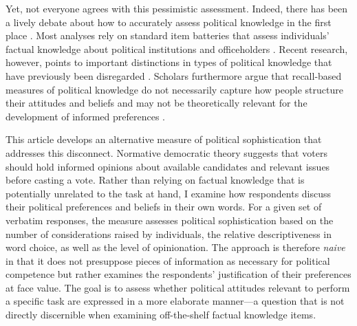 \documentclass[12pt]{article}
\begin{document}
Yet, not everyone agrees with this pessimistic assessment. Indeed, there has been a lively debate about how to accurately assess political knowledge in the first place \citep[e.g.][]{mondak2000reconsidering,mondak2001asked,sturgis2008experiment,debell2013harder,pietryka2013analysis}. Most analyses rely on standard item batteries that assess individuals' factual knowledge about political institutions and officeholders \citep[e.g.,][]{carpini1996americans}. Recent research, however, points to important distinctions in types of political knowledge that have previously been disregarded \citep{barabas2014question}. Scholars furthermore argue that recall-based measures of political knowledge do not necessarily capture how people structure their attitudes and beliefs \citep[e.g.,][]{luskin1987measuring} and may not be theoretically relevant for the development of informed preferences \citep[e.g.,][]{lupia2006elitism,gilens2001political}.


This article develops an alternative measure of political sophistication that addresses this disconnect. Normative democratic theory suggests that voters should hold informed opinions about available candidates and relevant issues before casting a vote. Rather than relying on factual knowledge that is potentially unrelated to the task at hand, I examine how respondents discuss their political preferences and beliefs in their own words. For a given set of verbatim responses, the measure assesses political sophistication based on the number of considerations raised by individuals, the relative descriptiveness in word choice, as well as the level of opinionation. The approach is therefore \textit{naive} in that it does not presuppose pieces of information as necessary for political competence but rather examines the respondents' justification of their preferences at face value. The goal is to assess whether political attitudes relevant to perform a specific task are expressed in a more elaborate manner---a question that is not directly discernible when examining off-the-shelf factual knowledge items. %
\end{document}
